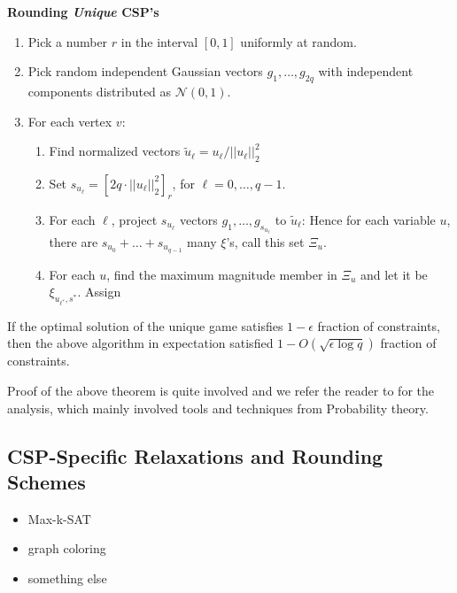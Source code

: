 \begin{algorithm}\textbf{Rounding \textit{Unique} CSP's}
\begin{enumerate}
\item Pick a number $r$ in the interval $[0, 1]$ uniformly at random.
\item Pick random independent Gaussian vectors $g_1, \ldots, g_{2q}$ with independent components distributed as $\mathcal{N}(0, 1)$.
\item For each vertex $v$:
\begin{enumerate}
\item Find normalized vectors $\tilde{u}_{\ell} = {u_{\ell}}/{||u_\ell||_2^2}$
\item Set $s_{u_\ell} = [2q \cdot ||u_\ell||_2^2]_r$, for $\ell=0, \ldots, q-1$.
\item For each $\ell$, project $s_{u_\ell}$ vectors $g_1, \ldots, g_{s_{u_\ell}}$ to $\tilde{u}_\ell$:
Hence for each variable $u$, there are $s_{u_0}+\ldots+s_{u_{q-1}}$ many $\xi$'s, call this set $\Xi_u$.
\item For each $u$, find the maximum magnitude member in $\Xi_u$ and let it be $\xi_{u_{\ell^*}, s^*}$. Assign
\end{enumerate}
\end{enumerate}
\end{algorithm}
\begin{theorem}
If the optimal solution of the unique game satisfies $1-\epsilon$ fraction of constraints, then the above algorithm in expectation satisfied $1-O({\sqrt{\epsilon \log q }})$ fraction of constraints.
\end{theorem}
Proof of the above theorem is quite involved and we refer the reader to \cite{cmm06} for the analysis, which mainly involved tools and techniques from Probability theory.

\subsection{CSP-Specific Relaxations and Rounding Schemes}
\begin{itemize}
\item Max-k-SAT
\item graph coloring
\item something else
\end{itemize}